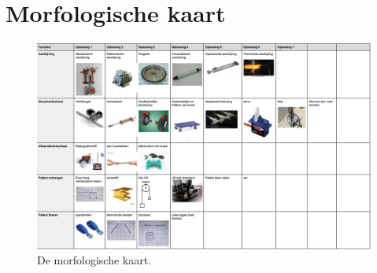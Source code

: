 \chapter{Morfologische kaart}
\label{ap:bijlage_A}


\begin{figure}
    \includegraphics[width = 180mm, angle = 270]{06_bijlage_A/morf_kaart.png}
    \caption{De morfologische kaart.}
    \label{fig:morf_kaart}
\end{figure}